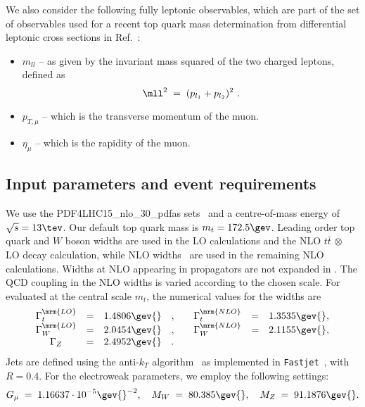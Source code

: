 We also consider the following fully leptonic observables, which are
part of the set of observables used for a recent top quark mass
determination from differential leptonic cross sections in Ref.~\cite{ATLAS-CONF-2017-044}:
\begin{itemize}

\item $m_{ll}$ -- as given by the invariant mass squared of the two charged
  leptons, defined as
  \begin{equation}\label{def:mll}
    \mll^2\;=\;(p_{l_1}+p_{l_2})^2~.
  \end{equation}
 
\item $p_{T,\mu}$ -- which is the transverse momentum of the muon.

\item $\eta_{\mu}$ -- which is the rapidity of the muon.

\end{itemize}


\subsection{Input parameters and event requirements}
\label{subsec:input}

We use the  PDF4LHC15\_nlo\_30\_pdfas
sets~\cite{Butterworth:2015oua,Dulat:2015mca,Harland-Lang:2014zoa,Ball:2014uwa}
and a centre-of-mass energy of $\sqrt{s}=13\tev$.
Our default top quark mass is  $m_t=172.5\gev$.
Leading order top quark and $W$ boson widths are used in the LO calculations and the NLO $t\bar{t}\, \otimes$ LO decay calculation, while NLO widths~\citep{Jezabek:1987nf} are used in the remaining NLO calculations.
Widths at NLO appearing in propagators are not expanded in \as{}.
The QCD coupling in the NLO widths is varied according to the chosen
scale. For \as{} evaluated at the central scale $m_t$, the numerical values for the widths are
\begin{equation}
\begin{matrix}
\Gamma_t^\mrm{LO} &=& 1.4806\gev{}&,&\quad \Gamma_t^\mrm{NLO} &=& 1.3535\gev{},\\
\Gamma_W^\mrm{LO} &=& 2.0454\gev{}&,&\quad \Gamma_W^\mrm{NLO} &=& 2.1155\gev{},\\
\Gamma_Z &=& 2.4952\gev{}&.& &&\\
\end{matrix}
\end{equation}
Jets are defined using the anti-$k_T$ algorithm~\cite{Cacciari:2008gp} as implemented in 
{\tt Fastjet}~\cite{Cacciari:2011ma}, with $R=0.4$.
For the electroweak parameters, we employ the following settings:
\begin{equation}\label{eq:ewparam}
  G_{\mu}\;=\;1.16637\cdot10^{-5}\gev{}^{-2},\quad
  M_{W} \;=\;80.385\gev{},\quad
  M_{Z} \;=\;91.1876\gev{}.
\end{equation}

